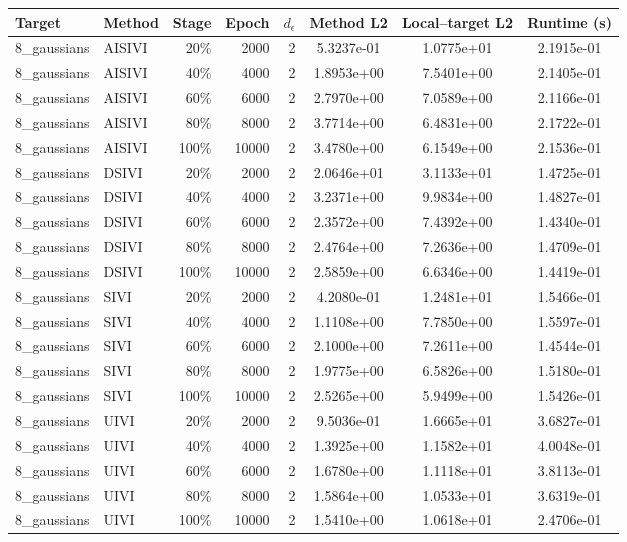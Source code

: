 \begin{tabular}{llrrrccc}
\toprule
Target & Method & Stage & Epoch & $d_\epsilon$ & Method L2 & Local--target L2 & Runtime (s) \\
\midrule
8\_gaussians & AISIVI & 20\% & 2000 & 2 & 5.3237e-01 & 1.0775e+01 & 2.1915e-01 \\
8\_gaussians & AISIVI & 40\% & 4000 & 2 & 1.8953e+00 & 7.5401e+00 & 2.1405e-01 \\
8\_gaussians & AISIVI & 60\% & 6000 & 2 & 2.7970e+00 & 7.0589e+00 & 2.1166e-01 \\
8\_gaussians & AISIVI & 80\% & 8000 & 2 & 3.7714e+00 & 6.4831e+00 & 2.1722e-01 \\
8\_gaussians & AISIVI & 100\% & 10000 & 2 & 3.4780e+00 & 6.1549e+00 & 2.1536e-01 \\
8\_gaussians & DSIVI & 20\% & 2000 & 2 & 2.0646e+01 & 3.1133e+01 & 1.4725e-01 \\
8\_gaussians & DSIVI & 40\% & 4000 & 2 & 3.2371e+00 & 9.9834e+00 & 1.4827e-01 \\
8\_gaussians & DSIVI & 60\% & 6000 & 2 & 2.3572e+00 & 7.4392e+00 & 1.4340e-01 \\
8\_gaussians & DSIVI & 80\% & 8000 & 2 & 2.4764e+00 & 7.2636e+00 & 1.4709e-01 \\
8\_gaussians & DSIVI & 100\% & 10000 & 2 & 2.5859e+00 & 6.6346e+00 & 1.4419e-01 \\
8\_gaussians & SIVI & 20\% & 2000 & 2 & 4.2080e-01 & 1.2481e+01 & 1.5466e-01 \\
8\_gaussians & SIVI & 40\% & 4000 & 2 & 1.1108e+00 & 7.7850e+00 & 1.5597e-01 \\
8\_gaussians & SIVI & 60\% & 6000 & 2 & 2.1000e+00 & 7.2611e+00 & 1.4544e-01 \\
8\_gaussians & SIVI & 80\% & 8000 & 2 & 1.9775e+00 & 6.5826e+00 & 1.5180e-01 \\
8\_gaussians & SIVI & 100\% & 10000 & 2 & 2.5265e+00 & 5.9499e+00 & 1.5426e-01 \\
8\_gaussians & UIVI & 20\% & 2000 & 2 & 9.5036e-01 & 1.6665e+01 & 3.6827e-01 \\
8\_gaussians & UIVI & 40\% & 4000 & 2 & 1.3925e+00 & 1.1582e+01 & 4.0048e-01 \\
8\_gaussians & UIVI & 60\% & 6000 & 2 & 1.6780e+00 & 1.1118e+01 & 3.8113e-01 \\
8\_gaussians & UIVI & 80\% & 8000 & 2 & 1.5864e+00 & 1.0533e+01 & 3.6319e-01 \\
8\_gaussians & UIVI & 100\% & 10000 & 2 & 1.5410e+00 & 1.0618e+01 & 2.4706e-01 \\

\end{tabular}
